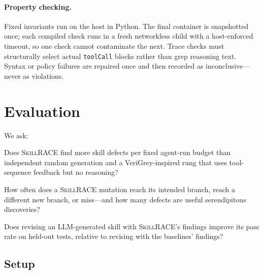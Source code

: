 \documentclass[acmsmall,screen,review,anonymous]{acmart}
\newcommand{\tool}{\textsc{SkillRACE}\xspace}
\begin{document}
\paragraph{Property checking.} Fixed invariants run on the host in Python. The final
container is snapshotted once; each compiled check runs in a fresh networkless child
with a host-enforced timeout, so one check cannot contaminate the next. Trace checks
must structurally select actual \texttt{toolCall} blocks rather than grep reasoning
text. Syntax or policy failures are repaired once and then recorded as
inconclusive---never as violations.

\section{Evaluation}
\label{sec:eval}

We ask:
\begin{description}[leftmargin=3.2em,itemsep=1pt]
  \item[RQ1] Does \tool find more skill defects per fixed agent-run budget than
  independent random generation and a VeriGrey-inspired rung that uses tool-sequence feedback but no
  reasoning?
  \item[RQ2] How often does a \tool mutation reach its intended branch, reach a different
  new branch, or miss---and how many defects are useful serendipitous discoveries?
  \item[RQ3] Does revising an LLM-generated skill with \tool's findings improve its pass
  rate on held-out tests, relative to revising with the baselines' findings?
\end{description}

\subsection{Setup}
\label{sec:setup}
\end{document}
